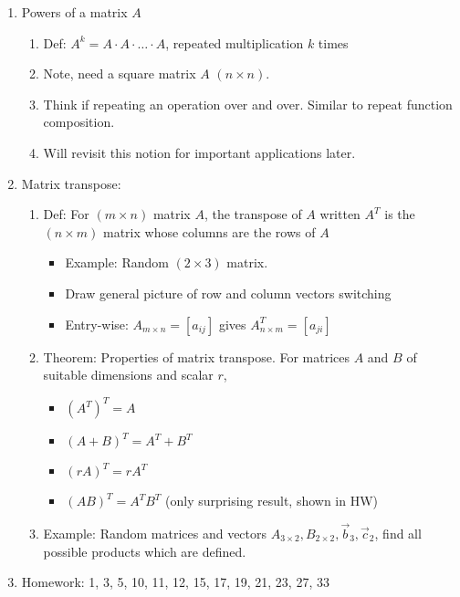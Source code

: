 \documentclass{article}
\begin{document}
\begin{enumerate}
\begin{enumerate}
\end{enumerate}


\item Powers of a matrix $A$
\begin{enumerate}
\item Def: $A^k = A \cdot A \cdot \dots \cdot A$, repeated multiplication $k$ times
\item Note, need a square matrix $A$ $(n \times n)$. 
\item Think if repeating an operation over and over. Similar to repeat function composition.
\item Will revisit this notion for important applications later.
\end{enumerate}


\item Matrix transpose:
\begin{enumerate}

\item Def: For $(m \times n)$ matrix $A$, the transpose of $A$ written $A^T$ is the $(n \times m)$ matrix whose columns are the rows of $A$
\begin{itemize}
\item Example: Random $(2 \times 3)$ matrix. 
\item Draw general picture of row and column vectors switching
\item Entry-wise: $A_{m \times n} = [a_{ij}]$ gives $A^T_{n \times m} = [a_{ji}]$
\end{itemize}

\item Theorem: Properties of matrix transpose. For matrices $A$ and $B$ of suitable dimensions and scalar $r$, 
\begin{itemize}
\item $(A^T)^T = A$
\item $(A+B)^T = A^T + B^T$
\item $(rA)^T = rA^T$
\item $(AB)^T = A^T B^T$ (only surprising result, shown in HW)
\end{itemize}

\item Example: Random matrices and vectors $A_{3 \times 2}, B_{2 \times 2}, \vec{b}_3, \vec{c}_2$, find all possible products which are defined.

\end{enumerate}

\item Homework: 1, 3, 5, 10, 11, 12, 15, 17, 19, 21, 23, 27, 33

\end{enumerate}
\end{document}
